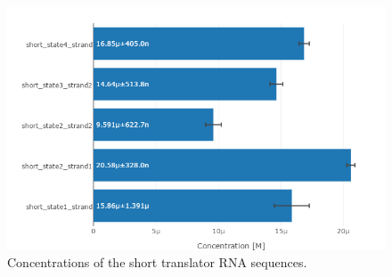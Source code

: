 \begin{figure}
\centering
\includegraphics[width=\columnwidth]{images/translator_transcription_concentration.png}
\caption{Concentrations of the short translator RNA sequences.}
\label{translator_transcription_concentration}
\end{figure}


